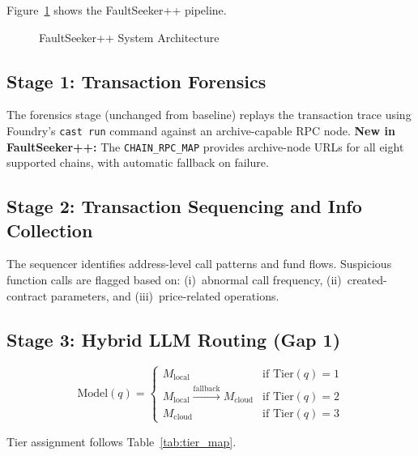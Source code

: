 \documentclass[conference]{IEEEtran}
\begin{document}
Figure~\ref{fig:architecture} shows the FaultSeeker++ pipeline.

\begin{figure}[h]
  \centering
  \caption{FaultSeeker++ System Architecture}
  \label{fig:architecture}
\end{figure}

\subsection{Stage 1: Transaction Forensics}

The forensics stage (unchanged from baseline) replays the transaction
trace using Foundry's \texttt{cast run} command against an
archive-capable RPC node.
\textbf{New in FaultSeeker++:} The \texttt{CHAIN\_RPC\_MAP} provides
archive-node URLs for all eight supported chains, with automatic
fallback on failure.

\subsection{Stage 2: Transaction Sequencing and Info Collection}

The sequencer identifies address-level call patterns and fund flows.
Suspicious function calls are flagged based on:
(i)~abnormal call frequency, (ii)~created-contract parameters, and
(iii)~price-related operations.

\subsection{Stage 3: Hybrid LLM Routing (Gap 1)}

\begin{equation}
  \text{Model}(q) = \begin{cases}
    M_{\text{local}} & \text{if Tier}(q) = 1 \\
    M_{\text{local}} \xrightarrow{\text{fallback}} M_{\text{cloud}} & \text{if Tier}(q) = 2 \\
    M_{\text{cloud}} & \text{if Tier}(q) = 3
  \end{cases}
\end{equation}

Tier assignment follows Table~\ref{tab:tier_map}.
\end{document}
